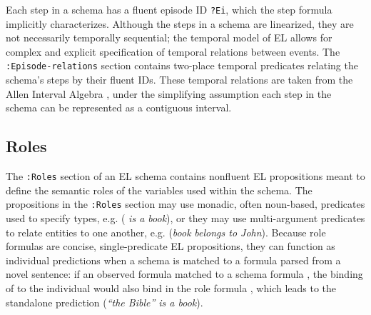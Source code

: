 Each step in a schema has a fluent episode ID \texttt{?Ei}, which the step formula implicitly characterizes.
Although the steps in a schema are linearized, they are not necessarily temporally sequential; the temporal model of EL allows for complex and explicit specification of temporal relations between events.
The \texttt{:Episode-relations} section contains two-place temporal predicates relating the schema's steps by their fluent IDs.
These temporal relations are taken from the Allen Interval Algebra \citep{allen1983maintaining}, under the simplifying assumption each step in the schema can be represented as a contiguous interval.


\subsection{Roles}
\label{sec:roles}
The \texttt{:Roles} section of an EL schema contains nonfluent EL propositions meant to define the semantic roles of the variables used within the schema.
The propositions in the \texttt{:Roles} section may use monadic, often noun-based, predicates used to specify types, e.g.  ( \textit{is a book}), or they may use multi-argument predicates to relate entities to one another, e.g.  (\textit{book}  \textit{belongs to John}).
Because role formulas are concise, single-predicate EL propositions, they can function as individual predictions when a schema is matched to a formula parsed from a novel sentence: if an observed formula  matched to a schema formula , the binding of  to the individual  would also bind  in the role formula , which leads to the standalone prediction  (\textit{``the Bible'' is a book}).

